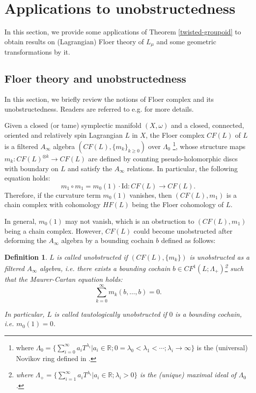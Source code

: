 \documentclass{amsart}
\newtheorem{defn}[theorem]{Definition}
\numberwithin{equation}{section}
\newcommand{\Id}{\mathrm{Id}}
\begin{document}
\section{Applications to unobstructedness}

In this section, we provide some applications of Theorem \ref{twisted-groupoid} to obtain results on (Lagrangian) Floer theory of $L_\mu$ and some geometric transformations by it. 

\subsection{Floer theory and unobstructedness}
In this section, we briefly review the notions of Floer complex and its unobstructedness. Readers are referred to e.g. \cite{Fukaya-corr, FOOO,FOOOinvol} for more details.

Given a closed (or tame) symplectic manifold $(X, \omega)$ and a closed, connected, oriented and relatively spin Lagrangian $L$ in $X$, the Floer complex $CF(L)$ of $L$ is a filtered $A_\infty$ algebra $(CF(L), \{m_k\}_{k\geq 0})$ over $\Lambda_0$
\footnote{where $\Lambda_0 = \{\sum_{i=0}^\infty a_i T^{\lambda_i}| a_i \in \mathbb{R}; 0=\lambda_0<\lambda_1<\cdots; \lambda_i \rightarrow \infty\}$ is the (universal) Novikov ring defined in \cite[Definition 2.1]{Fukaya-corr}.}, whose structure maps $m_k: CF(L)^{\otimes k} \rightarrow CF(L)$ are defined by counting pseudo-holomorphic discs with boundary on $L$ and satisfy the $A_\infty$ relations. In particular, the following equation holds:
$$m_1 \circ m_1 = m_0(1) \cdot \Id: CF(L) \rightarrow CF(L).$$
Therefore, if the curvature term $m_0(1)$ vanishes, then $(CF(L), m_1)$ is a chain complex with cohomology $HF(L)$ being the Floer cohomology of $L$.

In general, $m_0(1)$ may not vanish, which is an obstruction to $(CF(L), m_1)$ being a chain complex. However, $CF(L)$ could become unobstructed after deforming the $A_\infty$ algebra by a bounding cochain $b$ defined as follows:

\begin{defn}\label{unobstructedlag}
$L$ is called unobstructed if $(CF(L), \{m_k\})$ is unobstructed as a filtered $A_\infty$ algebra, i.e. there exists a bounding cochain $b\in CF^1(L; \Lambda_+)$\footnote{where $\Lambda_+ = \{\sum_{i=1}^\infty a_i T^{\lambda_i}| a_i \in \mathbb{R}; \lambda_i > 0\}$ is the (unique) maximal ideal of $\Lambda_0$.} such that the Maurer-Cartan equation holds:
$$\sum_{k=0}^{\infty} m_k(b, \ldots, b) = 0.$$  

In particular, $L$ is called tautologically unobstructed if $0$ is a bounding cochain, i.e. $m_0(1) = 0$.
\end{defn}
\end{document}
